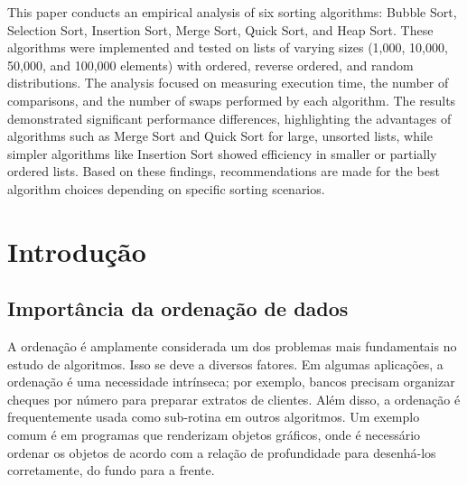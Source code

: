 \documentclass[tcc2]{uftex}
\begin{document}
  \begin{foreignabstract}
  This paper conducts an empirical analysis of six sorting algorithms: Bubble Sort, Selection Sort, Insertion Sort, Merge Sort, Quick Sort, and Heap Sort. These algorithms were implemented and tested on lists of varying sizes (1,000, 10,000, 50,000, and 100,000 elements) with ordered, reverse ordered, and random distributions. The analysis focused on measuring execution time, the number of comparisons, and the number of swaps performed by each algorithm. The results demonstrated significant performance differences, highlighting the advantages of algorithms such as Merge Sort and Quick Sort for large, unsorted lists, while simpler algorithms like Insertion Sort showed efficiency in smaller or partially ordered lists. Based on these findings, recommendations are made for the best algorithm choices depending on specific sorting scenarios.
  \end{foreignabstract}
  \printlosymbols  
  \printloabbreviations
  \listoffigures
  \listoftables 
  \tableofcontents %
\mainmatter
\onehalfspacing

\chapter{Introdução}
\section{Importância da ordenação de dados}
A ordenação é amplamente considerada um dos problemas mais fundamentais no estudo de algoritmos. Isso se deve a diversos fatores. Em algumas aplicações, a ordenação é uma necessidade intrínseca; por exemplo, bancos precisam organizar cheques por número para preparar extratos de clientes. Além disso, a ordenação é frequentemente usada como sub-rotina em outros algoritmos. Um exemplo comum é em programas que renderizam objetos gráficos, onde é necessário ordenar os objetos de acordo com a relação de profundidade para desenhá-los corretamente, do fundo para a frente. \cite{2022:Thomas}
\end{document}
